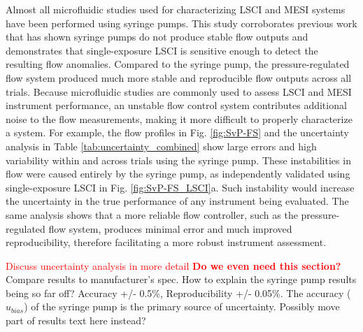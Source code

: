 \documentclass[12pt]{spieman}
\begin{document}
\begin{spacing}{2}
Almost all microfluidic studies used for characterizing LSCI and MESI systems have been performed using syringe pumps. This study corroborates previous work \cite{Korczyk:2010eu,Li:2014ca,Zhou:2011ey} that has shown syringe pumps do not produce stable flow outputs and demonstrates that single-exposure LSCI is sensitive enough to detect the resulting flow anomalies. Compared to the syringe pump, the pressure-regulated flow system produced much more stable and reproducible flow outputs across all trials. Because microfluidic studies are commonly used to assess LSCI and MESI instrument performance, an unstable flow control system contributes additional noise to the flow measurements, making it more difficult to properly characterize a system. For example, the flow profiles in Fig. \ref{fig:SvP-FS} and the uncertainty analysis in Table \ref{tab:uncertainty_combined} show large errors and high variability within and across trials using the syringe pump. These instabilities in flow were caused entirely by the syringe pump, as independently validated using single-exposure LSCI in Fig. \ref{fig:SvP-FS_LSCI}a. Such instability would increase the uncertainty in the true performance of any instrument being evaluated. The same analysis shows that a more reliable flow controller, such as the pressure-regulated flow system, produces minimal error and much improved reproducibility, therefore facilitating a more robust instrument assessment. 

\textcolor{red}{Discuss uncertainty analysis in more detail \textbf{Do we even need this section?}} Compare results to manufacturer's spec. How to explain the syringe pump results being so far off? Accuracy +/- 0.5\%, Reproducibility +/- 0.05\%. The accuracy ($u_{bias}$) of the syringe pump is the primary source of uncertainty. Possibly move part of results text here instead?


\end{spacing}
\end{document}
